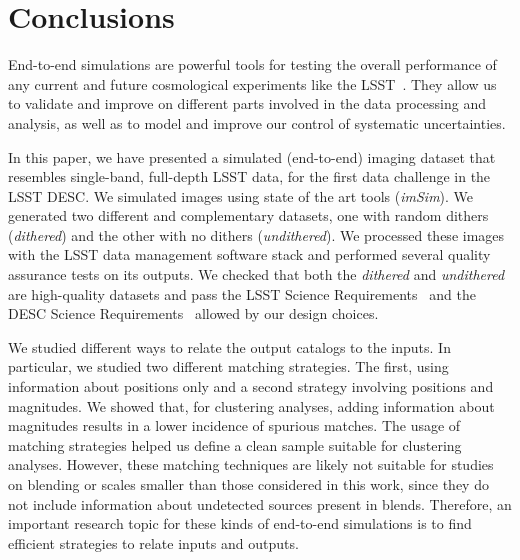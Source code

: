 \documentclass[twocolumn]{aastex62}
\begin{document}

\section{Conclusions}
\label{sec:conclusions}

End-to-end simulations are powerful tools for testing the overall performance of any current and future cosmological experiments like the LSST~\citep{Overview}. They allow us to validate and improve on different parts involved in the data processing and analysis, as well as to model and improve our control of systematic uncertainties.

In this paper, we have presented a simulated (end-to-end) imaging dataset that resembles single-band, full-depth LSST data, for the first data challenge in the LSST DESC. We simulated images using state of the art tools (\textit{imSim}). We generated two different and complementary datasets, one with random dithers (\textit{dithered}) and the other with no dithers (\textit{undithered}). We processed these images with the LSST data management software stack and performed several quality assurance tests on its outputs. We checked that both the \textit{dithered} and \textit{undithered} are high-quality datasets and pass the LSST Science Requirements~\citep{LPM-17} and the DESC Science Requirements~\citep{2018arXiv180901669T} allowed by our design choices.

We studied different ways to relate the output catalogs to the inputs. In particular, we studied two different matching strategies. The first, using information about positions only and a second strategy involving positions and magnitudes. We showed that, for clustering analyses, adding information about magnitudes results in a lower incidence of spurious matches. The usage of matching strategies helped us define a clean sample suitable for clustering analyses. However, these matching techniques are likely not suitable for studies on blending or scales smaller than those considered in this work, since they do not include information about undetected sources present in blends. Therefore, an important research topic for these kinds of end-to-end simulations is to find efficient strategies to relate inputs and outputs.
\end{document}
